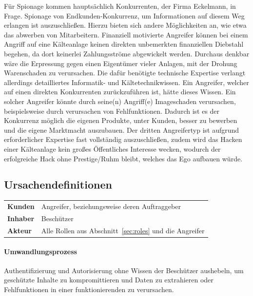 \documentclass[11pt,a4paper]{report}
\begin{document}
Für Spionage kommen hauptsächlich Konkurrenten, der Firma Eckelmann, in Frage. Spionage von Endkunden-Konkurrenz, um Informationen auf diesem Weg erlangen ist auszuschließen. Hierzu bieten sich andere Möglichkeiten an, wie etwa das abwerben von Mitarbeitern. Finanziell motivierte Angreifer können bei einem Angriff auf eine Kälteanlage keinen direkten unbemerkten finanziellen Diebstahl begehen, da dort keinerlei Zahlungsströme abgewickelt werden. Durchaus denkbar wäre die Erpressung gegen einen Eigentümer vieler Anlagen, mit der Drohung Warenschaden zu verursachen. Die dafür benötigte technische Expertise verlangt allerdings detailliertes Informatik- und Kältetechnikwissen. Ein Angreifer, welcher auf einen direkten Konkurrenten zurückzuführen ist, hätte dieses Wissen. Ein solcher Angreifer könnte durch seine(n) Angriff(e) Imageschaden verursachen, beispielsweise durch verursachen von Fehlfunktionen. Dadurch ist es der Konkurrenz möglich die eigenen Produkte, unter Kunden, besser zu bewerben und die eigene Marktmacht auszubauen. Der dritten Angreifertyp ist aufgrund erforderlicher Expertise fast vollständig auszuschließen, zudem wird das Hacken einer Kälteanlage kein großes Öffentliches Interesse wecken, wodurch der erfolgreiche Hack ohne Prestige/Ruhm bleibt, welches das Ego aufbauen würde.

\subsection{Ursachendefinitionen}

\begin{table}[h] %
\begin{tabularx}{\linewidth}{@{}lX@{}}
\textbf{Kunden} & Angreifer, beziehungsweise deren Auftraggeber\\
\textbf{Inhaber} & Beschützer\\
\textbf{Akteur} & Alle Rollen aus Abschnitt~\ref{sec:roles} und die Angreifer\\
\end{tabularx}
\end{table}

\paragraph{Umwandlungsprozess} Authentifizierung und Autorisierung ohne Wissen der Beschützer aushebeln, um geschützte Inhalte zu kompromittieren und Daten zu extrahieren oder Fehlfunktionen in einer funktionierenden zu verursachen.
\end{document}
